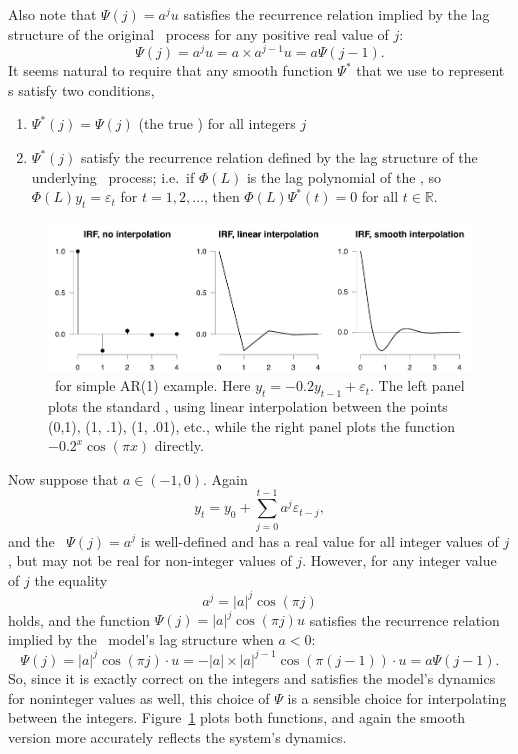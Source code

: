 \documentclass[12pt,fleqn]{article}
\newcommand{\vep}{\varepsilon}
\newcommand{\AR}{\allcaps{AR}}
\newcommand{\RR}{\mathbb{R}}
\begin{document}
Also note that $\Psi(j) = a^j u$ satisfies the recurrence relation
implied by the lag structure of the original \AR\ process for any
positive real value of $j$:
\begin{equation*}
  \Psi(j) = a^j u = a \times a^{j-1} u = a \Psi(j-1).
\end{equation*}
It seems natural to require that any smooth function $\Psi^*$ that we
use to represent \IRF s satisfy two conditions,
\begin{enumerate}
\item $\Psi^*(j) = \Psi(j)$ (the true \IRF) for all integers $j$
\item $\Psi^*(j)$ satisfy the recurrence relation defined by the lag
  structure of the underlying \VAR\ process; i.e.\ if $\Phi(L)$ is the
  lag polynomial of the \VAR, so $\Phi(L)y_t = \vep_t$ for $t = 1, 2,
  \dots$, then $\Phi(L) \Psi^*(t) = 0$ for all $t \in \RR$.
\end{enumerate}

\begin{figure}[t]
  \centering
  \includegraphics{graphs/motivation2.pdf}
  \caption{\IRF\ for simple AR(1) example. Here $y_t = -0.2 y_{t-1} +
    \vep_t$. The left panel plots the standard \IRF, using linear
    interpolation between the points (0,1), (1, .1), (1, .01), etc.,
    while the right panel plots the function $- 0.2^x \cos(\pi x)$ directly.}
  \label{f0b}
\end{figure}

Now suppose that $a \in (-1, 0)$. Again
\begin{equation}
  \label{eq:4}
    y_t = y_0 + \sum_{j=0}^{t-1} a^j \vep_{t-j},
\end{equation}
and the \IRF\ $\Psi(j) = a^j$ is well-defined and has a real value for
all integer values of $j$, but may not be real for non-integer values
of $j$. However, for any integer value of $j$ the equality
\begin{equation}
  \label{eq:5}
  a^j = |a|^j \cos(\pi j)
\end{equation}
holds, and the function $\Psi(j) = |a|^j \cos(\pi j) u$ satisfies the
recurrence relation implied by the \AR\ model's lag structure when $a < 0$:
\begin{equation*}
  \Psi(j) = |a|^j \cos(\pi j) \cdot u = - |a| \times |a|^{j-1} \cos(\pi (j-1)) \cdot u = a \Psi(j-1).
\end{equation*}
So, since it is exactly correct on the integers and satisfies the
model's dynamics for noninteger values as well, this choice of $\Psi$
is a sensible choice for interpolating between the
integers. Figure~\ref{f0b} plots both functions, and again the smooth
version more accurately reflects the system's dynamics.
\end{document}
